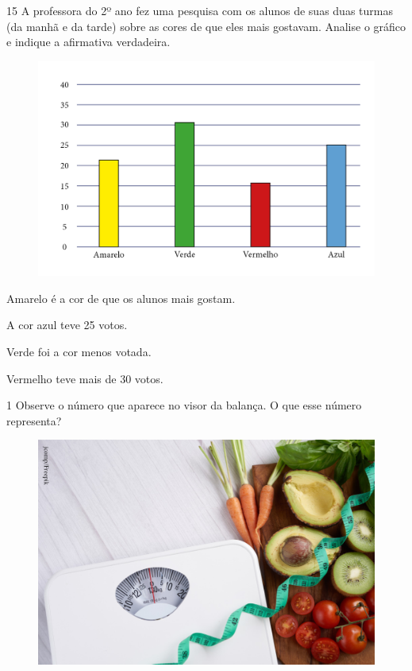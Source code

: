 \num{15} A professora do 2º ano fez uma pesquisa com os alunos de suas duas
turmas (da manhã e da tarde) sobre as cores de que eles mais gostavam.
Analise o gráfico e indique a afirmativa verdadeira.

\begin{figure}[H]
\includegraphics[width=\textwidth]{./media/image136.png}
\end{figure}

\begin{escolha}[itemsep=-5pt]
\item Amarelo é a cor de que os alunos mais gostam.

\item A cor azul teve 25 votos.

\item Verde foi a cor menos votada.

\item Vermelho teve mais de 30 votos.
\end{escolha}

\blankpage
\vspace*{-3.4cm}


\num{1} Observe o número que aparece no visor da balança. O que esse número
representa?

\begin{figure}[H]
\centering
\includegraphics[width=.6\textwidth]{./media/image137.png}
\end{figure}

